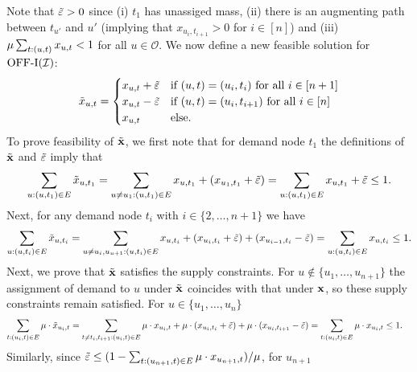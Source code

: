 { Note that $\Tilde{\varepsilon} > 0$ since (i) $t_1$ has unassiged mass, (ii) there is an augmenting path between $t_{u'}$ and $u'$ (implying that $x_{u_i, t_{i+1}} > 0$ for $i \in [n]$) and (iii) {$\mu \sum_{t: (u,t)} x_{u,t} < 1$ for all $u \in \mathcal O$}. We now define a new feasible solution for $\mathrm{\mathrm{OFF}}\textrm{-}\mathrm{I}(\mathcal I)$:
 \begin{equation*}
     \Tilde{x}_{u,t} = \begin{cases}
         x_{u,t} + \Tilde{\varepsilon} & \text{if $(u,t) = (u_i,t_i)$ for all $i \in [n+1]$}\\
         x_{u,t} - \Tilde{\varepsilon} & \text{if $(u,t) = (u_i,t_{i+1})$ for all $i \in [n]$}\\
         x_{u,t}  & \text{else.}\\
     \end{cases}
 \end{equation*}
To prove feasibility of $\Tilde{\mathbf{x}}$, we first note that for demand node $t_1$ the definitions of $\Tilde{\mathbf{x}}$ and $\Tilde{\varepsilon}$ imply that
  \begin{equation*}
      \sum_{u:(u,t_1) \in E} \Tilde{x}_{u, t_1} = \sum_{u \not= u_1:(u,t_1) \in E} x_{u, t_1} + (x_{u_1, t_1} + \Tilde{\varepsilon}) = \sum_{u:(u,t_1) \in E} x_{u, t_1} + \Tilde{\varepsilon} \leq 1.
  \end{equation*}
  Next, for any demand node $t_i$ with $i \in \{2, \ldots, n+1\}$ we have
  \begin{equation*}
      \sum_{u:(u,t_i) \in E} \Tilde{x}_{u, t_i} = \sum_{u \not= u_i, u_{u+1}:(u,t_i) \in E} x_{u, t_i} + (x_{u_i, t_i} + \Tilde{\varepsilon}) + (x_{u_{i-1}, t_i} - \Tilde{\varepsilon}) = \sum_{u:(u,t_i) \in E} x_{u, t_i} \leq 1.
  \end{equation*}
  Next, we prove that $\Tilde{\mathbf{x}}$ satisfies the supply constraints. For $u \not \in \{u_1, \ldots, u_{n+1}\}$ the assignment of demand to $u$ under $\Tilde{\mathbf{x}}$ coincides with that under $\mathbf{x}$, so these supply constraints remain satisfied. For $u \in \{u_1, \ldots, u_n \}$  
  \begin{align}
      \sum_{t: (u_i, t) \in E} \prob \cdot \Tilde{x}_{u_i, t} = \sum_{t \not= t_i, t_{i+1}: (u_i, t) \in E} \prob \cdot x_{u_i, t} + \prob \cdot (x_{u_i,t_i} + \Tilde{\varepsilon}) + \prob \cdot (x_{u_i,t_{i+1}} - \Tilde{\varepsilon}) &= \sum_{t: (u_i, t) \in E} \prob \cdot x_{u_i, t} %
      \leq 1.\notag
  \end{align}
  Similarly, since { $\Tilde{\varepsilon}\leq (1- \sum_{t:(u_{n+1},t) \in E} \mu \cdot x_{u_{n+1},t})/\mu$, for $u_{n+1}$
}}
